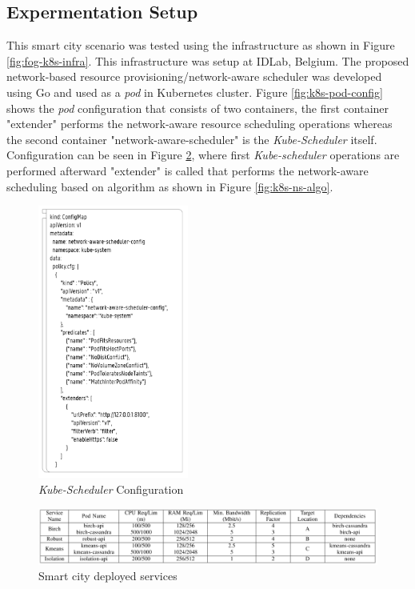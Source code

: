 \subsection{Expermentation Setup}
\label{sec:setup}
This smart city scenario was tested using the infrastructure as shown in Figure \ref{fig:fog-k8s-infra}. This infrastructure was setup at IDLab, Belgium\cite{Santos2019}. The proposed network-based resource provisioning/network-aware scheduler was developed using Go and used as a \emph{pod} in Kubernetes cluster\cite{Santos2019}. Figure \ref{fig:k8s-pod-config} shows the \emph{pod} configuration that consists of two containers, the first container "extender" performs the network-aware resource scheduling operations whereas the second container "network-aware-scheduler" is the \emph{Kube-Scheduler} itself\cite{Santos2019}. Configuration can be seen in Figure \ref{fig:k8s-sch-config}, where first \emph{Kube-scheduler} operations are performed afterward "extender" is called that performs the network-aware scheduling based on algorithm\cite{Santos2019} as shown in Figure \ref{fig:k8s-ns-algo}. \par
\begin{figure}
  \centering
  \includegraphics[width=\linewidth, height=9cm]{figures/mlcn-k8s-scheduler-config.pdf}
  \caption{\emph{Kube-Scheduler} Configuration\cite{Santos2019}}
  \label{fig:k8s-sch-config}
\end{figure}
\begin{figure}
  \includegraphics[width=\linewidth]{figures/mlcn-k8s-service-pods.pdf}
  \caption{Smart city deployed services\cite{Santos2019}}
  \label{fig:k8s-sch-config}
\end{figure}
